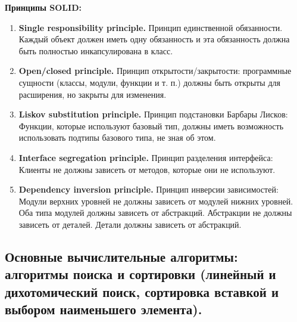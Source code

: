 \documentclass[12pt, a4paper]{article}
\begin{document}
\textbf{Принципы SOLID:}
\begin{enumerate}
    \item \textbf{Single responsibility principle.} Принцип единственной обязанности. Каждый объект должен иметь одну обязанность и эта обязанность должна быть полностью инкапсулирована в класс.
    \item \textbf{Open/closed principle.} Принцип открытости/закрытости: программные сущности (классы, модули, функции и т. п.) должны быть открыты для расширения, но закрыты для изменения.
    \item \textbf{Liskov substitution principle.} Принцип подстановки Барбары Лисков: Функции, которые используют базовый тип, должны иметь возможность использовать подтипы базового типа, не зная об этом.
    \item \textbf{Interface segregation principle.} Принцип разделения интерфейса: Клиенты не должны зависеть от методов, которые они не используют.
    \item \textbf{Dependency inversion principle.} Принцип инверсии зависимостей: Модули верхних уровней не должны зависеть от модулей нижних уровней. Оба типа модулей должны зависеть от абстракций. Абстракции не должны зависеть от деталей. Детали должны зависеть от абстракций.
\end{enumerate}



\subsection{Основные вычислительные алгоритмы: алгоритмы поиска и сортировки (линейный и дихотомический поиск, сортировка вставкой и выбором наименьшего элемента).}

\begin{figure}[h]
\end{figure}
\end{document}
